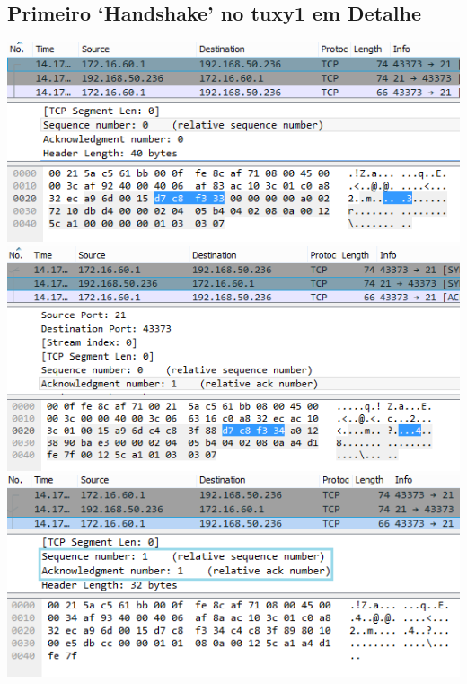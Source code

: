\documentclass[11pt,a4paper,reqno]{report}
\numberwithin{equation}{section}
\begin{document}
\begin{appendices}
\subsection{Primeiro `Handshake' no tuxy1 em Detalhe}
\label{ex6_tux1_1sthandshake}
\includegraphics[width=18cm]{ex6_handshake1.png}
\includegraphics[width=18cm]{ex6_handshake2.png}
\includegraphics[width=18cm]{ex6_handshake3.png}


\end{appendices}
\end{document}
